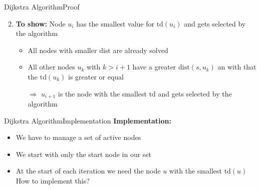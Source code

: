 \begin{frame}{Dijkstra Algorithm}{Proof}
  \begin{figure}[!h]
    \begin{adjustbox}{width=0.9\linewidth}
      \def\DijkstraTD{1}%
      
    \end{adjustbox}
  \end{figure}
  \begin{enumerate}
    \setcounter{enumi}{1}
    \item
      \textbf{To show:} Node {\color{Mittel-Blau}$u_i$} has the smallest
      value for {\color{Mittel-Blau}$\mathrm{td}(u_i)$} and gets selected by
      the algorithm
      \begin{itemize}
        \item
          All nodes with smaller {\color{Mittel-Blau}$\mathrm{dist}$} are
          already solved
        \item
          All other nodes {\color{Mittel-Blau}$u_k$} with
          {\color{Mittel-Blau}$k > i + 1$} have a greater
          {\color{Mittel-Blau}$\mathrm{dist}(s, u_k)$}
          an with that the  {\color{Mittel-Blau}$\mathrm{td}(u_k)$} is greater
          or equal
        \item[$\Rightarrow$]
          {\color{Mittel-Blau}$u_{i+1}$} is the node with the
          smallest {\color{Mittel-Blau}$\mathrm{td}$} and gets selected by the
          algorithm
      \end{itemize}
  \end{enumerate}
\end{frame}


\begin{frame}{Dijkstra Algorithm}{Implementation}
  \textbf{Implementation:}
  \begin{itemize}
    \item
      We have to manage a set of {\color{Mittel-Blau}active nodes}
    \item
      We start with only the {\color{Mittel-Blau}start node} in our set
    \item
      At the start of each iteration we need the node
      {\color{Mittel-Blau}$u$} with the smallest
      {\color{Mittel-Blau}$\mathrm{td}(u)$}\\[0.5em]
      {\color{gray}How to implement this?}
  \end{itemize}
\end{frame}

